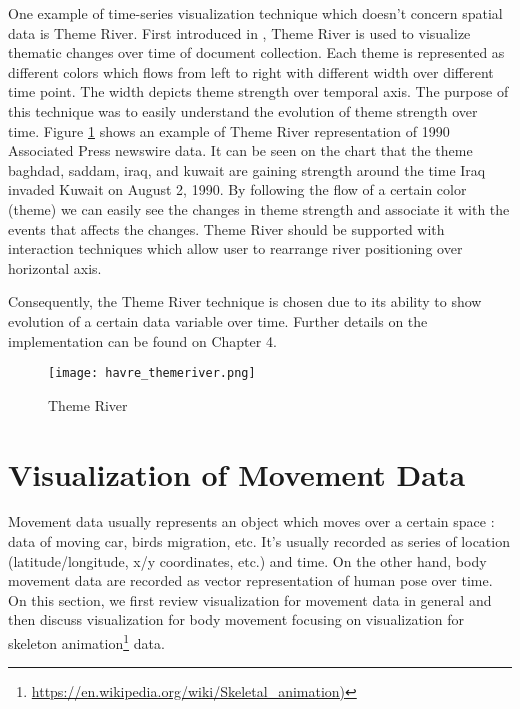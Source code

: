 One example of time-series visualization technique which doesn't concern spatial data is Theme River. First introduced in \cite{havre}, Theme River is used to visualize thematic changes over time of document collection. Each theme is represented as different colors which flows from left to right with different width over different time point. The width depicts theme strength over temporal axis. The purpose of this technique was to easily understand the evolution of theme strength over time. Figure \ref{themeriver} shows an example of Theme River representation of 1990 Associated Press newswire data. It can be seen on the chart that the theme baghdad, saddam, iraq, and kuwait are gaining strength  around the time Iraq invaded Kuwait on August 2, 1990. By following the flow of a certain color (theme) we can easily see the changes in theme strength and associate it with the events that affects the changes. Theme River should be supported with interaction techniques which allow user to rearrange river positioning over horizontal axis. 

Consequently, the Theme River technique is chosen due to its ability to show evolution of a certain data variable over time. Further details on the implementation can be found on Chapter 4.

\begin{figure}
\centering
\texttt{[image: havre\_themeriver.png]}
\caption{Theme River}
\label{themeriver}
\end{figure}


\section{Visualization of Movement Data}

Movement data usually represents an object which moves over a certain space \cite{adrienko_book}: data of moving car, birds migration, etc. It's usually recorded as series of location (latitude/longitude, x/y coordinates, etc.) and time. On the other hand, body movement data are recorded as vector representation of human pose \cite{bernard2013} over time. On this section, we first review visualization for movement data in general and then discuss visualization for body movement focusing on visualization for skeleton animation\footnote{\url{https://en.wikipedia.org/wiki/Skeletal_animation)}} data.

